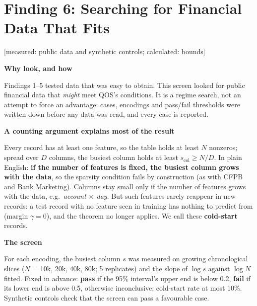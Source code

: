 \documentclass[10pt]{article}
\newcommand{\subhead}[1]{%
    \par
    \vspace{6pt}%
    \textbf{#1}%
    \par
    \vspace{2pt}%
}
\newcommand{\evlabel}[1]{\textsf{\small[#1]}}
\newenvironment{sectionblock}
{%
    \par
    \vspace{2pt}
    \noindent
    \begin{minipage}{\textwidth}
}
{%
    \end{minipage}
    \par
    \vspace{5pt}
}
\begin{document}
\begin{sectionblock}

\section{Finding 6: Searching for Financial Data That Fits}
\label{sec:f6}

\evlabel{measured: public data and synthetic controls; calculated: bounds}

\subhead{Why look, and how}
Findings 1--5 tested data that was easy to obtain. This screen looked for public financial data that \emph{might} meet QOS's conditions. It is a regime search, not an attempt to force an advantage: cases, encodings and pass/fail thresholds were written down before any data was read, and every case is reported.

\subhead{A counting argument explains most of the result}
Every record has at least one feature, so the table holds at least $N$ nonzeros; spread over $D$ columns, the busiest column holds at least $s_{\mathrm{col}} \ge N/D$. In plain English: \textbf{if the number of features is fixed, the busiest column grows with the data}, so the sparsity condition fails by construction (as with CFPB and Bank Marketing). Columns stay small only if the number of features grows with the data, e.g.\ \emph{account $\times$ day}. But such features rarely reappear in new records: a test record with no feature seen in training has nothing to predict from (margin $\gamma=0$), and the theorem no longer applies. We call these \textbf{cold-start} records.

\subhead{The screen}
For each encoding, the busiest column $s$ was measured on growing chronological slices ($N$ = 10k, 20k, 40k, 80k; 5 replicates) and the slope of $\log s$ against $\log N$ fitted. Fixed in advance: \textbf{pass} if the 95\% interval's upper end is below 0.2, \textbf{fail} if its lower end is above 0.5, otherwise inconclusive; cold-start rate at most 10\%. Synthetic controls check that the screen can pass a favourable case.


\end{sectionblock}
\end{document}
